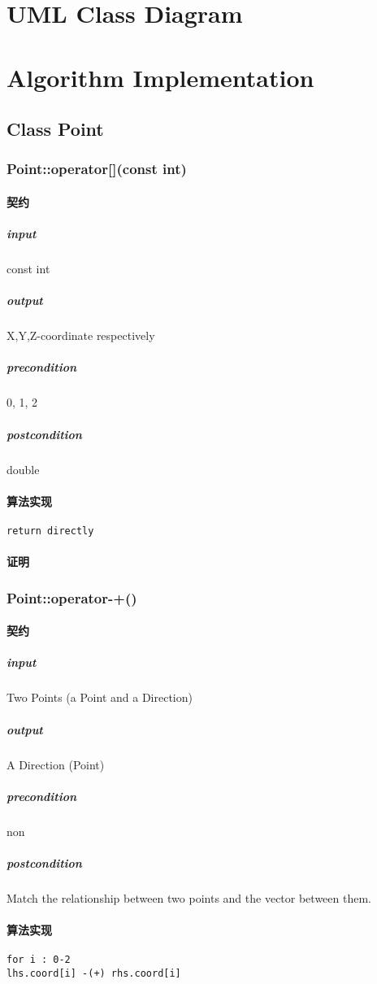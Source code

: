 \documentclass[a4paper]{book}
\numberwithin{equation}{chapter}
\theoremstyle{definition}
\begin{document}
\begin{multicols}{2}
\section{UML Class Diagram}
%

\section{Algorithm Implementation}
%
\subsection{Class Point}


\subsubsection{Point::operator[](const int)}
\paragraph{契约}
\subparagraph{input}
const int
\subparagraph{output}
X,Y,Z-coordinate respectively
\subparagraph{precondition}
0, 1, 2
\subparagraph{postcondition}
double
\paragraph{算法实现}
\begin{lstlisting}
return directly
\end{lstlisting}
\paragraph{证明}


\subsubsection{Point::operator-+()}
\paragraph{契约}
\subparagraph{input}
Two Points (a Point and a Direction)
\subparagraph{output}
A Direction (Point)
\subparagraph{precondition}
non
\subparagraph{postcondition}
Match the relationship between two points and the vector between them.

\paragraph{算法实现}
\begin{lstlisting}
for i : 0-2
lhs.coord[i] -(+) rhs.coord[i]
\end{lstlisting}

\end{multicols}
\end{document}
